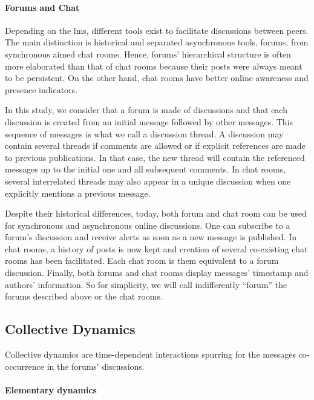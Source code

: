 \documentclass[a4paper,twoside]{article}
\begin{document}
\paragraph{Forums and Chat}

Depending on the \gls{lms}, different tools exist to facilitate discussions between peers. The main distinction is historical and separated asynchronous tools, forums, from synchronous aimed chat rooms.  Hence, forums' hierarchical structure is often more elaborated than that of chat rooms because their posts were always meant to be persistent.  On the other hand, chat rooms have better online awareness and presence indicators.

In this study, we consider that a forum is made of discussions and that each discussion is created from an initial message followed by other messages.  This sequence of messages is what we call a discussion thread.  A discussion may contain several threads if comments are allowed or if explicit references are made to previous publications.   In that case, the new thread will contain the referenced messages up to the initial one and all subsequent comments.  In chat rooms, several interrelated threads may also appear in a unique discussion when one explicitly mentions a previous message.

Despite their historical differences, today, both forum and chat room can be used for synchronous and asynchronous online discussions.  One can subscribe to a forum's discussion and receive alerts as soon as a new message is published.  In chat rooms, a history of posts is now kept and creation of several co-existing chat rooms has been facilitated.  Each chat room is them equivalent to a forum discussion. Finally, both forums and chat rooms display messages' timestamp and authors' information.
So for simplicity, we will call indifferently ``forum'' the forums described above or the chat rooms.

\subsection{Collective Dynamics}

Collective dynamics are time-dependent interactions spurring for the messages co-occurrence in the forums' discussions.

\paragraph{Elementary dynamics}
\end{document}
